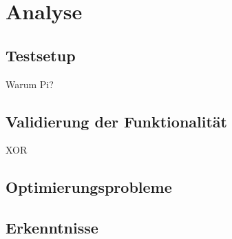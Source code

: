 \chapter{Analyse}
\label{chap:analysis}

\section{Testsetup}
Warum Pi?
\section{Validierung der Funktionalität}
XOR
\section{Optimierungsprobleme}
\section{Erkenntnisse}
